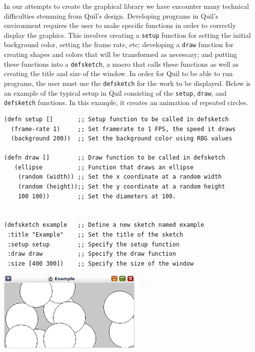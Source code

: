 \documentclass[12pt]{article}
\begin{document}
In our attempts to create the graphical library we have encounter many technical difficulties stemming from Quil's design. Developing programs in Quil's environment requires the user to make specific functions in order to correctly display the graphics. This involves creating a \texttt{setup} function for setting the initial background color, setting the frame rate, etc; developing a \texttt{draw} function for creating shapes and colors that will be transformed as necessary; and putting these functions into a \texttt{defsketch}, a macro that calls these functions as well as creating the title and size of the window. In order for Quil to be able to run programs, the user must use the \texttt{defsketch} for the work to be displayed. Below is an example of the typical setup in Quil consisting of the \texttt{setup}, \texttt{draw}, and \texttt{defsketch} functions. In this example, it creates an animation of repeated circles.
\begin{verbatim}
(defn setup []       ;; Setup function to be called in defsketch
  (frame-rate 1)     ;; Set framerate to 1 FPS, the speed it draws
  (background 200))  ;; Set the background color using RBG values

(defn draw []        ;; Draw function to be called in defsketch
   (ellipse          ;; Function that draws an ellipse
    (random (width)) ;; Set the x coordinate at a random width
    (random (height));; Set the y coordinate at a random height
    100 100))        ;; Set the diameters at 100.


(defsketch example   ;; Define a new sketch named example
 :title "Example"    ;; Set the title of the sketch
 :setup setup        ;; Specify the setup function
 :draw draw          ;; Specify the draw function
 :size [400 300])    ;; Specify the size of the window
\end{verbatim}

\vspace*{0.1in}

\begin{center}
\includegraphics[width=200pt]{quil-example}
\end{center}
\end{document}
